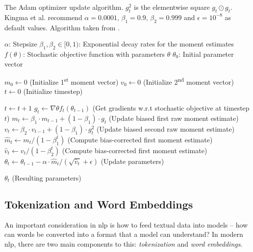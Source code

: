 \begin{algorithm}
    \centering
    \caption{The Adam optimizer update algorithm. $g^2_t$ is the elementwise square $g_t \odot g_t$. Kingma et al. recommend $\alpha = 0.0001$, $\beta_1 = 0.9$, $\beta_2 = 0.999$ and $\epsilon = 10^{-8}$ as default values. Algorithm taken from \cite{Kingma.2015}.}
    \begin{algorithmic}
    \Require $\alpha$: Stepsize
    \Require $\beta_1, \beta_2 \in [0,1)$: Exponential decay rates for the moment estimates
    \Require $f(\theta)$: Stochastic objective function with parameters $\theta$
    \Require $\theta_0$: Initial parameter vector

    \State $m_0 \leftarrow 0$ (Initialize 1\textsuperscript{st} moment vector)
    \State $v_0 \leftarrow 0$ (Initialize 2\textsuperscript{nd} moment vector)
    \State $t \leftarrow 0$ (Initialize timestep)

        \State $t \leftarrow t+1$
        \State $g_t \leftarrow \nabla{\theta}f_t(\theta_{t-1})$ (Get gradients w.r.t stochastic objective at timestep $t$)
        \State $m_t \leftarrow \beta_1 \cdot m_{t-1} + (1 - \beta_1) \cdot g_t$ (Update biased first raw moment estimate)
        \State $v_t \leftarrow \beta_2 \cdot v_{t-1} + (1 - \beta_1) \cdot g^2_t$ (Update biased second raw moment estimate)
        \State $\widehat{m}_t \leftarrow m_t / (1 - \beta^t_1)$ (Compute bias-corrected first moment estimate)
        \State $\widehat{v}_t \leftarrow v_t / (1 - \beta^t_2)$ (Compute bias-corrected first moment estimate)
        \State $\theta_t \leftarrow \theta_{t-1} - \alpha \cdot \widehat{m}_t / (\sqrt{\widehat{v}_t} + \epsilon)$ (Update parameters)
    \EndWhile

    \State \Return $\theta_t$ (Resulting parameters)
    \end{algorithmic}
    \label{alg:adam}
\end{algorithm}


\subsection{Tokenization and Word Embeddings}
\label{sec:embeddings}
An important consideration in \ac{nlp} is how to feed textual data into models -- how can words be converted into a format that a model can understand?
In modern \ac{nlp}, there are two main components to this: \emph{tokenization} and \emph{word embeddings}.

